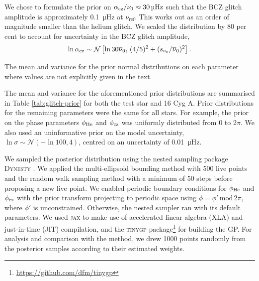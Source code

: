 We chose to formulate the prior on \(\alpha_{{\mathrm{cz}}}/\nu_0 \approx \SI{30}{\micro\hertz}\) such that the BCZ glitch amplitude is approximately \SI{0.1}{\micro\hertz} at \(\nu_\mathrm{ref}\). This works out as an order of magnitude smaller than the helium glitch. We scaled the distribution by 80 per cent to account for uncertainty in the BCZ glitch amplitude,
%
\begin{equation*}
    \ln\alpha_{{\mathrm{cz}}} \sim \mathcal{N}\left[ \ln 30\overline{\nu}_0, \, (4/5)^2 + (s_{\nu_0}/\overline{\nu}_0)^2\right].
\end{equation*}
%

\begin{table}
    \centering
    \caption{The mean and variance for the prior normal distributions on each parameter where values are not explicitly given in the text.}
    \label{tab:glitch-prior}
    
\end{table}

The mean and variance for the aforementioned prior distributions are summarised in Table \ref{tab:glitch-prior} for both the test star and 16 Cyg A. Prior distributions for the remaining parameters were the same for all stars. For example, the prior on the phase parameters \(\phi_{{\mathrm{He}}}\) and \(\phi_{{\mathrm{cz}}}\) was uniformly distributed from 0 to \(2\pi\). We also used an uninformative prior on the model uncertainty, \(\ln\sigma \sim \mathcal{N}( - \ln 100, 4)\), centred on an uncertainty of \SI{0.01}{\micro\hertz}.

We sampled the posterior distribution using the nested sampling package \textsc{Dynesty} \citep{Speagle2020,Koposov.Speagle.ea2023}. We applied the multi-ellipsoid bounding method \citep{Feroz.Hobson.ea2009} with 500 live points and the random walk sampling method \citep{Skilling2006} with a minimum of 50 steps before proposing a new live point. We enabled periodic boundary conditions for \(\phi_{{\mathrm{He}}}\) and \(\phi_{{\mathrm{cz}}}\) with the prior transform projecting to periodic space using \(\phi = \phi'\,\mathrm{mod}\,2\pi\), where \(\phi'\) is unconstrained. Otherwise, the nested sampler ran with its default parameters. We used \textsc{jax} \citep{Bradbury.Frostig.ea2018} to make use of accelerated linear algebra (XLA) and just-in-time (JIT) compilation, and the \textsc{tinygp} package\footnote{\url{https://github.com/dfm/tinygp}} for building the GP. For analysis and comparison with the  method, we drew 1000 points randomly from the posterior samples according to their estimated weights.

